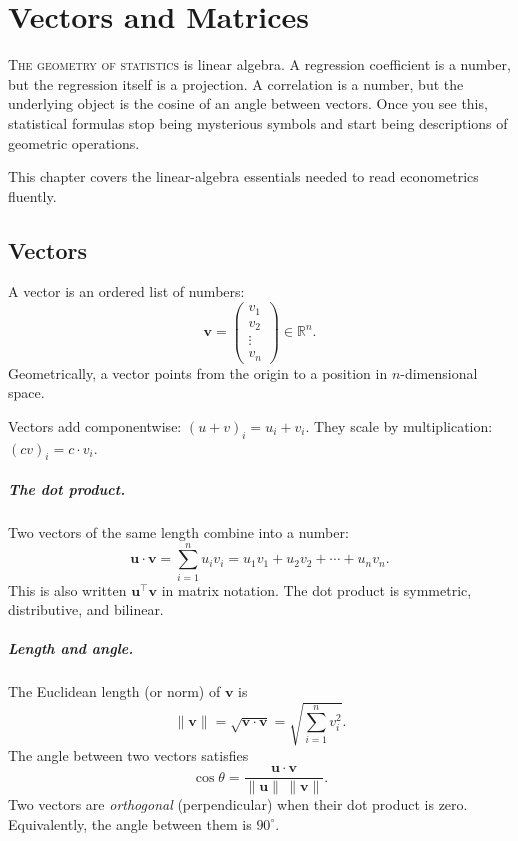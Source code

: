 \chapter{Vectors and Matrices}
\label{ch:matrices}

\noindent\textsc{The geometry of statistics} is linear algebra. A regression coefficient is a number, but the regression itself is a projection. A correlation is a number, but the underlying object is the cosine of an angle between vectors. Once you see this, statistical formulas stop being mysterious symbols and start being descriptions of geometric operations.

This chapter covers the linear-algebra essentials needed to read econometrics fluently.

\section{Vectors}

A vector is an ordered list of numbers:
\[
  \bm{v} = \begin{pmatrix} v_1 \\ v_2 \\ \vdots \\ v_n \end{pmatrix} \in \mathbb{R}^n.
\]
Geometrically, a vector points from the origin to a position in $n$-dimensional space.

Vectors add componentwise: $(u + v)_i = u_i + v_i$. They scale by multiplication: $(c v)_i = c \cdot v_i$.

\paragraph{The dot product.} Two vectors of the same length combine into a number:
\begin{equation}
  \bm{u} \cdot \bm{v} = \sum_{i=1}^{n} u_i v_i = u_1 v_1 + u_2 v_2 + \cdots + u_n v_n.
  \label{eq:dot-product}
\end{equation}
This is also written $\bm{u}^\top \bm{v}$ in matrix notation. The dot product is symmetric, distributive, and bilinear.

\paragraph{Length and angle.} The Euclidean length (or norm) of $\bm{v}$ is
\[
  \|\bm{v}\| = \sqrt{\bm{v} \cdot \bm{v}} = \sqrt{\sum_{i=1}^{n} v_i^2}.
\]
The angle between two vectors satisfies
\begin{equation}
  \cos\theta = \frac{\bm{u} \cdot \bm{v}}{\|\bm{u}\|\,\|\bm{v}\|}.
  \label{eq:angle-formula}
\end{equation}
Two vectors are \emph{orthogonal} (perpendicular) when their dot product is zero. Equivalently, the angle between them is $90^\circ$.


